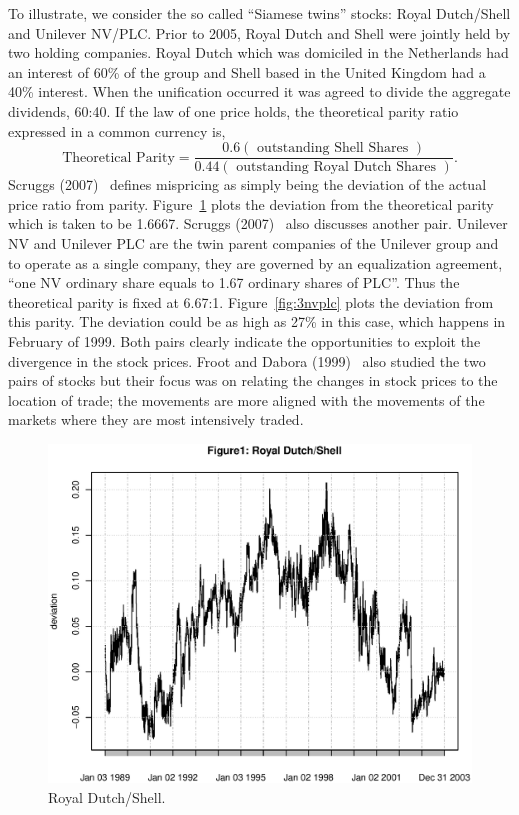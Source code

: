 To illustrate, we consider the so called ``Siamese twins'' stocks: Royal Dutch/Shell and Unilever NV/PLC. Prior to 2005, Royal Dutch and Shell were jointly held by two holding companies. Royal Dutch which was domiciled in the Netherlands had an interest of 60\% of the group and Shell based in the United Kingdom had a 40\% interest. When the unification occurred it was agreed to divide the aggregate dividends, 60:40. If the law of one price holds, the theoretical parity ratio expressed in a common currency is,
	\[
	\text{Theoretical Parity}= \frac{0.6 (\text{ outstanding Shell Shares })}{0.44 (\text{ outstanding Royal Dutch Shares })}.
	\]
Scruggs (2007)~\cite{scruggs} defines mispricing as simply being the deviation of the actual price ratio from parity. Figure~\ref{fig:3royal} plots the deviation from the theoretical parity which is taken to be 1.6667. Scruggs (2007)~\cite{scruggs} also discusses another pair. Unilever NV and Unilever PLC are the twin parent companies of the Unilever group and to operate as a single company, they are governed by an equalization agreement, ``one NV ordinary share equals to 1.67 ordinary shares of PLC''. Thus the theoretical parity is fixed at 6.67:1. Figure~\ref{fig:3nvplc} plots the deviation from this parity. The deviation could be as high as 27\% in this case, which happens in February of 1999. Both pairs clearly indicate the opportunities to exploit the divergence in the stock prices. Froot and Dabora (1999)~\cite{froot1999stock} also studied the two pairs of stocks but their focus was on relating the changes in stock prices to the location of trade; the movements are more aligned with the movements of the markets where they are most intensively traded.

	\begin{figure}[!ht]
	\centering
	\includegraphics[width=\textwidth]{chapters/chapter_stat_ts/figures/471.eps}
	\caption{Royal Dutch/Shell. \label{fig:3royal}}
	\end{figure}
	
